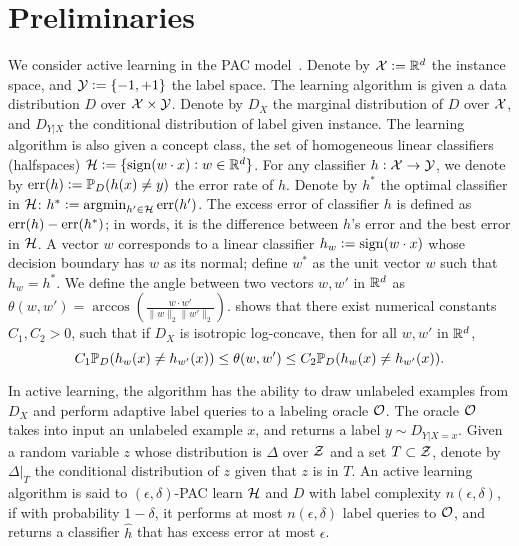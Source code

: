 \section{Preliminaries}
We consider active learning in the PAC model~\citep{V84, KSS94}.
Denote by $\mathcal{X} := \mathbb{R}^d$ the instance space, and $\mathcal{Y} := \{-1,+1\}$ the label space.
The learning algorithm is given a data distribution $D$ over $\mathcal{X} \times \mathcal{Y}$. %
Denote by $D_X$ the marginal distribution of $D$ over $\mathcal{X}$, and $D_{Y|X}$ the conditional distribution of label given instance.
The learning algorithm is also given a concept class, the set of homogeneous linear classifiers (halfspaces) $\mathcal{H}:=\{\operatorname{sign}(w \cdot x): w \in \mathbb{R}^d \}$.
For any classifier $h: \mathcal{X} \to \mathcal{Y}$, we denote by $\operatorname{err}(h):=\mathbb{P}_D(h(x) \neq y)$ the error rate of $h$.
Denote by $h^*$ the optimal classifier in $\mathcal{H}$: $h^*:=\operatorname{argmin}_{h' \in \mathcal{H}} \operatorname{err}(h')$.
The excess error of classifier $h$ is defined as $\operatorname{err}(h) - \operatorname{err}(h^*)$; in words, it is
the difference between $h$'s error and the best error in $\mathcal{H}$. A vector $w$ corresponds to a
linear classifier $h_w := \operatorname{sign}(w \cdot x)$ whose decision boundary has $w$ as its normal; define $w^*$ as the unit vector $w$ such that $h_w = h^*$. We define the angle between two vectors $w, w'$ in $\mathbb{R}^d$ as $\theta(w,w') = \arccos(\frac{w \cdot w'}{\|w\|_2 \| w'\|_2})$. \cite{BL13} shows that there exist numerical constants $C_1, C_2 > 0$, such that if $D_X$ is isotropic log-concave, then for all $w, w'$ in $\mathbb{R}^d$,
\begin{equation}
 C_1 \P_D(h_w(x) \neq h_{w'}(x)) \leq \theta(w,w') \leq C_2 \P_D(h_w(x) \neq h_{w'}(x)).
\label{eqn:angdis}
\end{equation}

In active learning, the algorithm has the ability to draw unlabeled examples from $D_X$ and perform adaptive label queries to a labeling oracle $\mathcal{O}$.
The oracle $\mathcal{O}$ takes into input an unlabeled example $x$, and returns a label $y \sim D_{Y|X=x}$.
Given a random variable $z$ whose distribution is $\Delta$ over $\mathcal{Z}$ and a set $T \subset \mathcal{Z}$, denote by $\Delta|_T$ the conditional distribution of $z$ given that $z$ is in $T$.
An active learning algorithm is said to $(\epsilon,\delta)$-PAC
learn $\mathcal{H}$ and $D$ with label complexity $n(\epsilon,\delta)$, if with probability $1-\delta$, it performs at most $n(\epsilon,\delta)$ label queries to $\mathcal{O}$,
and returns a classifier $\hat{h}$ that has excess error at most $\epsilon$.

